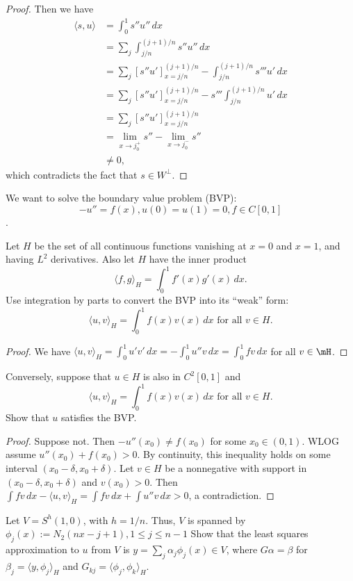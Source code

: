 \documentclass{article}
\begin{document}
\begin{proof}
Then we have 
\begin{align*}
\langle s, u \rangle & = \int_0^1 s'' u'' \, dx
\\ & = \sum_j \int_{j/n}^{(j+1)/n} s'' u'' \, dx
\\ & = \sum_j [s'' u']_{x=j/n}^{(j+1)/n} - \int_{j/n}^{(j+1)/n} s''' u' \, dx
\\ & = \sum_j [s'' u']_{x=j/n}^{(j+1)/n} -  s''' \int_{j/n}^{(j+1)/n}  u' \, dx
\\ & = \sum_j [s'' u']_{x=j/n}^{(j+1)/n} 
\\ & = \lim_{x \to j_0^+} s'' - \lim_{x \to j_0^-} s''
\\ & \neq 0,
\end{align*}
which contradicts the fact that $s \in W^\perp$. 
\end{proof}

 We want to solve the boundary value problem (BVP): 
$$-u'' = f(x), u(0) = u(1) = 0, f \in C[0,1]$$.

 Let $H$ be the set of all continuous functions vanishing at $x = 0$ and $x = 1$, and having $L^2$ derivatives. Also let $H$ have the inner product
$$\langle f, g \rangle_H = \int_0^1 f'(x) g'(x) \, dx.$$
Use integration by parts to convert the BVP into its ``weak'' form:
$$\langle u, v \rangle_H = \int_0^1 f(x) v(x) \, dx \text{ for all } v \in H.$$
\begin{proof}
We have $\langle u, v \rangle_H = \int_0^1 u' v' \, dx =  - \int_0^1 u'' v \, dx = \int_0^1 f v \, dx$ for all $v \in \mH$.
\end{proof}

 Conversely, suppose that $u \in H$ is also in $C^2[0,1]$ and 
$$\langle u, v \rangle_H  = \int_0^1 f(x) v(x) \, dx \text{ for all } v \in H.$$
Show that $u$ satisfies the BVP.
\begin{proof}
Suppose not. Then $-u''(x_0) \neq f(x_0)$ for some $x_0 \in (0,1)$. WLOG assume $u''(x_0) + f(x_0) > 0$.  By continuity, this inequality holds on some interval $(x_0 - \delta, x_0 + \delta)$. Let $v \in H$ be a nonnegative with support in $(x_0 - \delta, x_0 + \delta)$ and $v(x_0) > 0$.  Then $\int f v \, dx - \langle u, v \rangle_H = \int f v \, dx + \int u'' v \, dx  > 0$, a contradiction.
\end{proof}


 Let $V = S^h(1,0)$, with $h = 1/n$. Thus, $V$ is spanned by $\phi_j(x) := N_2(nx - j+1), 1 \le j \le n-1 $ Show that the least squares approximation to $u$ from $V$ is $y = \sum_j \alpha_j \phi_j(x) \in V$, where $G \alpha = \beta$ for $\beta_j = \langle y , \phi_j \rangle_H$ and $G_{kj} = \langle \phi_j, \phi_k \rangle_H$.
\end{document}
